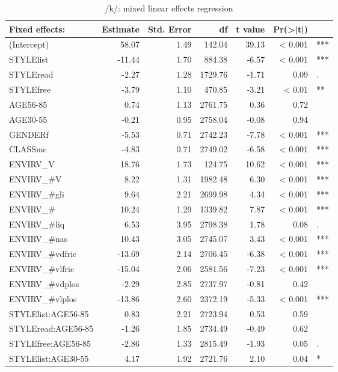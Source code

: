 {\footnotesize
	\begin{longtable}[c]{p{}rrrrrl}
				\caption{/k/: mixed linear effects regression}\label{tab.regression.k}\\
		\hline
		Fixed effects: & Estimate & Std. Error & df & t value & Pr(>|t|) & \\
		\hline
		(Intercept) & 58.07 & 1.49 & 142.04 & 39.13 & < 0.001 & *** \\ 
		STYLElist & -11.44 & 1.70 & 884.38 & -6.57 & < 0.001 & *** \\ 
		STYLEread & -2.27 & 1.28 & 1729.76 & -1.71 & 0.09 & . \\ 
		STYLEfree & -3.79 & 1.10 & 470.85 & -3.21 & < 0.01 & ** \\ 
		AGE56-85 & 0.74 & 1.13 & 2761.75 & 0.36 & 0.72 & \\ 
		AGE30-55 & -0.21 & 0.95 & 2758.04 & -0.08 & 0.94 & \\ 
		GENDERf & -5.53 & 0.71 & 2742.23 & -7.78 & < 0.001 & *** \\ 
		CLASSmc & -4.83 & 0.71 & 2749.02 & -6.58 & < 0.001 & *** \\ 
		ENVIRV\_V & 18.76 & 1.73 & 124.75 & 10.62 & < 0.001 & *** \\ 
		ENVIRV\_\#V & 8.22 & 1.31 & 1982.48 & 6.30 & < 0.001 & *** \\ 
		ENVIRV\_\#gli & 9.64 & 2.21 & 2699.98 & 4.34 & < 0.001 & *** \\ 
		ENVIRV\_\# & 10.24 & 1.29 & 1339.82 & 7.87 & < 0.001 & *** \\ 
		ENVIRV\_\#liq & 6.53 & 3.95 & 2798.38 & 1.78 & 0.08 & . \\ 
		ENVIRV\_\#nas & 10.43 & 3.05 & 2745.07 & 3.43 & < 0.001 & *** \\ 
		ENVIRV\_\#vdfric & -13.69 & 2.14 & 2706.45 & -6.38 & < 0.001 & *** \\ 
		ENVIRV\_\#vlfric & -15.04 & 2.06 & 2581.56 & -7.23 & < 0.001 & *** \\ 
		ENVIRV\_\#vdplos & -2.29 & 2.85 & 2737.97 & -0.81 & 0.42 & \\ 
		ENVIRV\_\#vlplos & -13.86 & 2.60 & 2372.19 & -5.33 & < 0.001 & *** \\ 
		STYLElist:AGE56-85 & 0.83 & 2.21 & 2723.94 & 0.53 & 0.59 & \\ 
		STYLEread:AGE56-85 & -1.26 & 1.85 & 2734.49 & -0.49 & 0.62 & \\ 
		STYLEfree:AGE56-85 & -2.86 & 1.33 & 2815.49 & -1.93 & 0.05 & . \\ 
		STYLElist:AGE30-55 & 4.17 & 1.92 & 2721.76 & 2.10 & 0.04 & * \\ 

\end{longtable}}
